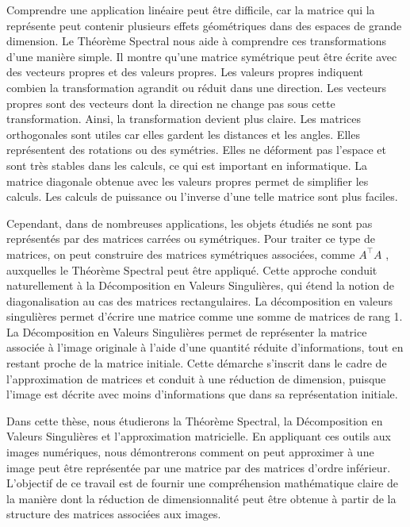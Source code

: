 \documentclass[12pt]{report}
\begin{document}
Comprendre une application linéaire peut être difficile, car la matrice qui la représente peut contenir plusieurs effets géométriques dans des espaces de grande dimension. Le Théorème Spectral nous aide à comprendre ces transformations d’une manière simple. Il montre qu’une matrice symétrique peut être écrite avec des vecteurs propres et des valeurs propres. Les valeurs propres indiquent combien la transformation agrandit ou réduit dans une direction. Les vecteurs propres sont des vecteurs dont la direction ne change pas sous cette transformation. Ainsi, la transformation devient plus claire. Les matrices orthogonales sont utiles car elles gardent les distances et les angles. Elles représentent des rotations ou des symétries. Elles ne déforment pas l’espace et sont très stables dans les calculs, ce qui est important en informatique. La matrice diagonale obtenue avec les valeurs propres permet de simplifier les calculs. Les calculs de puissance ou l'inverse d'une telle matrice sont plus faciles.

Cependant, dans de nombreuses applications, les objets étudiés ne sont pas représentés par des matrices carrées ou symétriques. Pour traiter ce type de matrices, on peut construire des matrices symétriques associées, comme $A^\top A$ , auxquelles le Théorème Spectral peut être appliqué. Cette approche conduit naturellement à la Décomposition en Valeurs Singulières, qui étend la notion de diagonalisation au cas des matrices rectangulaires. La décomposition en valeurs singulières permet d’écrire une matrice comme une somme de matrices de rang 1. La Décomposition en Valeurs Singulières permet de représenter la matrice associée à l’image originale à l’aide d’une quantité réduite d’informations, tout en restant proche de la matrice initiale. Cette démarche s’inscrit dans le cadre de l’approximation de matrices et conduit à une réduction de dimension, puisque l’image est décrite avec moins d’informations que dans sa représentation initiale.

Dans cette thèse, nous étudierons la Théorème Spectral, la Décomposition en Valeurs Singulières et l'approximation matricielle. En appliquant ces outils aux images numériques, nous démontrerons comment on peut approximer à une image peut être représentée par une matrice par des matrices d'ordre inférieur. L'objectif de ce travail est de fournir une compréhension mathématique claire de la manière dont la réduction de dimensionnalité peut être obtenue à partir de la structure des matrices associées aux images.


\clearpage
\end{document}
